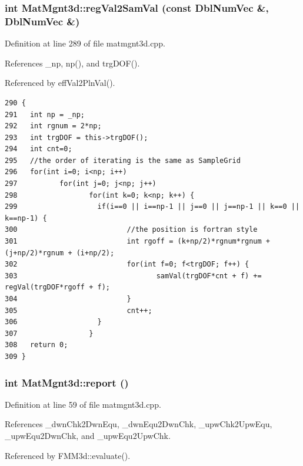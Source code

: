 \subsubsection{\setlength{\rightskip}{0pt plus 5cm}int Mat\-Mgnt3d::reg\-Val2Sam\-Val (const Dbl\-Num\-Vec \&, Dbl\-Num\-Vec \&)}\label{classMatMgnt3d_157f482e203a0f8c33570e8f0fbccdc4_157f482e203a0f8c33570e8f0fbccdc4}




Definition at line 289 of file matmgnt3d.cpp.

References \_\-np, np(), and trg\-DOF().

Referenced by eff\-Val2Pln\-Val().

\footnotesize\begin{verbatim}290 {
291   int np = _np;
292   int rgnum = 2*np;
293   int trgDOF = this->trgDOF();
294   int cnt=0;
295   //the order of iterating is the same as SampleGrid
296   for(int i=0; i<np; i++)
297          for(int j=0; j<np; j++)
298                 for(int k=0; k<np; k++) {
299                   if(i==0 || i==np-1 || j==0 || j==np-1 || k==0 || k==np-1) {
300                          //the position is fortran style
301                          int rgoff = (k+np/2)*rgnum*rgnum + (j+np/2)*rgnum + (i+np/2);
302                          for(int f=0; f<trgDOF; f++) {
303                                 samVal(trgDOF*cnt + f) += regVal(trgDOF*rgoff + f);
304                          }
305                          cnt++;
306                   }
307                 }
308   return 0;
309 }
\end{verbatim}\normalsize 


\subsubsection{\setlength{\rightskip}{0pt plus 5cm}int Mat\-Mgnt3d::report ()}\label{classMatMgnt3d_ae2b28144bd345f29a29ecd1b43d62b7_ae2b28144bd345f29a29ecd1b43d62b7}




Definition at line 59 of file matmgnt3d.cpp.

References \_\-dwn\-Chk2Dwn\-Equ, \_\-dwn\-Equ2Dwn\-Chk, \_\-upw\-Chk2Upw\-Equ, \_\-upw\-Equ2Dwn\-Chk, and \_\-upw\-Equ2Upw\-Chk.

Referenced by FMM3d::evaluate().

